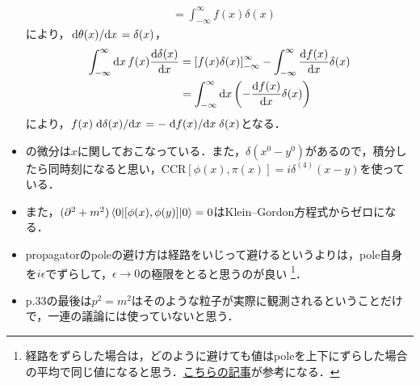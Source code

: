 \begin{itemize}
\begin{align}
			&= \int_{-\infty}^{\infty}f(x)\delta(x)
		\end{align}
		により，$\dv*{\theta(x)}{x}=\delta(x)$，
		\begin{align}
			\int_{-\infty}^{\infty}\dd{x}f(x)\dv{\delta(x)}{x}
			&= \qty[f(x)\delta(x)]_{-\infty}^{\infty}-\int_{-\infty}^{\infty}\dv{f(x)}{x}\delta(x)\\
			&= \int_{-\infty}^{\infty}\dd{x}\qty(-\dv{f(x)}{x}\delta(x))
		\end{align}
		により，$f(x)\dv*{\delta(x)}{x}=-\dv*{f(x)}{x}\delta(x)$となる．
	\item {}の微分は$x$に関しておこなっている．また，$\delta(x^0-y^0)$があるので，積分したら同時刻になると思い，CCR$[\phi(x), \pi(x)]=i\delta^{(4)}(x-y)$を使っている．
	\item また，$(\partial^2+m^2) \mel{0}{[\phi(x), \phi(y)]}{0} = 0$はKlein--Gordon方程式からゼロになる．
	\item propagatorのpoleの避け方は経路をいじって避けるというよりは，pole自身を$i\epsilon$でずらして，$\epsilon\to0$の極限をとると思うのが良い
		\footnote{経路をずらした場合は，どのように避けても値はpoleを上下にずらした場合の平均で同じ値になると思う．\href{https://mathrelish.com/physics/cauchy-principal-value-in-complex-space\#toc\_id\_3\_1}{こちらの記事}が参考になる．}．
	\item p.33の最後は$p^2=m^2$はそのような粒子が実際に観測されるということだけで，一連の議論には使っていないと思う．
\end{itemize}
